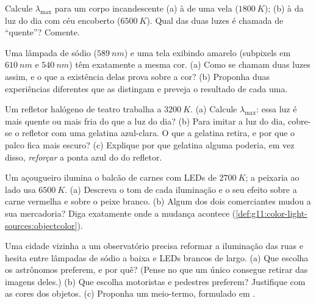 \begin{exercise}[$\star\star$]\label{exo:g11:color-light-sources:11}
Calcule $\lambda_{\max}$ para um corpo incandescente (a) à  de uma vela ($\qty{1800}{K}$); (b) à da luz do dia com céu encoberto
($\qty{6500}{K}$). Qual das duas luzes é chamada de ``quente''? Comente.
\end{exercise}

\begin{exercise}[$\star\star\star$]\label{exo:g11:color-light-sources:12}
Uma lâmpada de sódio ($\qty{589}{nm}$) e uma tela exibindo amarelo
(subpixels em $\qty{610}{nm}$ e $\qty{540}{nm}$) têm exatamente a mesma
cor. (a) Como se chamam duas luzes assim, e o que a existência delas
prova sobre a cor? (b) Proponha duas experiências diferentes que as
distingam e preveja o resultado de cada uma.
\end{exercise}

\begin{exercise}[$\star\star\star$]\label{exo:g11:color-light-sources:13}
Um refletor halógeno de teatro trabalha a $\qty{3200}{K}$. (a) Calcule
$\lambda_{\max}$: essa luz é mais quente ou mais fria do que a luz do
dia? (b) Para imitar a luz do dia, cobre-se o refletor com uma gelatina
azul-clara. O que a gelatina retira, e por que o palco fica mais escuro?
(c) Explique por que gelatina alguma poderia, em vez disso,
\emph{reforçar} a ponta azul do  do refletor.
\end{exercise}

\begin{exercise}[$\star\star\star$]\label{exo:g11:color-light-sources:14}
Um açougueiro ilumina o balcão de carnes com LEDs de 
$\qty{2700}{K}$; a peixaria ao lado usa $\qty{6500}{K}$. (a) Descreva o
tom de cada iluminação e o seu efeito sobre a carne vermelha e sobre o
peixe branco. (b) Algum dos dois comerciantes mudou a sua mercadoria?
Diga exatamente onde a mudança acontece
(\cref{def:g11:color-light-sources:objectcolor}).
\end{exercise}

\begin{exercise}[$\star\star\star$]\label{exo:g11:color-light-sources:15}
Uma cidade vizinha a um observatório precisa reformar a iluminação das
ruas e hesita entre lâmpadas de sódio a baixa  e LEDs brancos de
 largo. (a) Que escolha os astrônomos preferem, e por quê? (Pense
no que um único  consegue retirar das imagens deles.) (b) Que
escolha motoristas e pedestres preferem? Justifique com as cores dos
objetos. (c) Proponha um meio-termo, formulado em .
\end{exercise}

